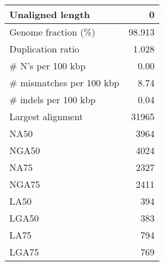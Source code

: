 \documentclass[12pt,a4paper]{article}
\begin{document}
\begin{table}[ht]
\begin{center}
\begin{tabular}{|l*{1}{|r}|}
Unaligned length & 0 \\ \hline
Genome fraction (\%) & 98.913 \\ \hline
Duplication ratio & 1.028 \\ \hline
\# N's per 100 kbp & 0.00 \\ \hline
\# mismatches per 100 kbp & 8.74 \\ \hline
\# indels per 100 kbp & 0.04 \\ \hline
Largest alignment & 31965 \\ \hline
NA50 & 3964 \\ \hline
NGA50 & 4024 \\ \hline
NA75 & 2327 \\ \hline
NGA75 & 2411 \\ \hline
LA50 & 394 \\ \hline
LGA50 & 383 \\ \hline
LA75 & 794 \\ \hline
LGA75 & 769 \\ \hline
\end{tabular}
\end{center}
\end{table}
\end{document}
